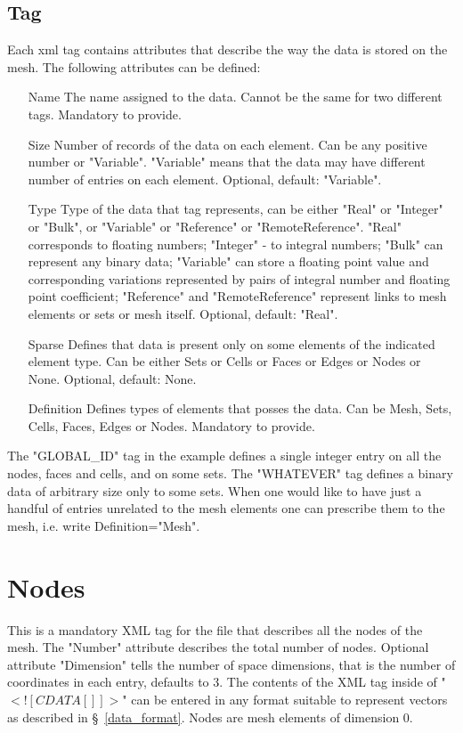 \documentclass[14pt]{article}
\begin{document}
\subsection{Tag}
Each xml tag contains attributes that describe the way the data is stored on the mesh. The following attributes can be defined:
\begin{itemize}
\item[Name] The name assigned to the data. Cannot be the same for two different tags. Mandatory to provide.
\item[Size] Number of records of the data on each element. Can be any positive number or "Variable". "Variable" means that the data may have different number of entries on each element. Optional, default: "Variable".
\item[Type] Type of the data that tag represents, can be either "Real" or "Integer" or "Bulk", or "Variable" or "Reference" or "RemoteReference". "Real" corresponds to floating numbers; "Integer" - to integral numbers; "Bulk" can represent any binary data; "Variable" can store a floating point value and corresponding variations represented by pairs of integral number and floating point coefficient; "Reference" and "RemoteReference" represent links to mesh elements or sets or mesh itself. Optional, default: "Real".
\item[Sparse] Defines that data is present only on some elements of the indicated element type. Can be either Sets or Cells or Faces or Edges or Nodes or None. Optional, default: None.
\item[Definition] Defines types of elements that posses the data. Can be Mesh, Sets, Cells, Faces, Edges or Nodes. Mandatory to provide.
\end{itemize}
The "GLOBAL\_ID" tag in the example defines a single integer entry on all the nodes, faces and cells, and on some sets. The "WHATEVER" tag defines a binary data of arbitrary size only to some sets. When one would like to have just a handful of entries unrelated to the mesh elements one can prescribe them to the mesh, i.e. write Definition="Mesh".

\section{Nodes}
This is a mandatory XML tag for the file that describes all the nodes of the mesh. The "Number" attribute describes the total number of nodes. Optional attribute "Dimension" tells the number of space dimensions, that is the number of coordinates in each entry, defaults to 3. The contents of the XML tag inside of "$<![CDATA[]]>$" can be entered in any format suitable to represent vectors as described in \S~\ref{data_format}. Nodes are mesh elements of dimension 0.
\end{document}

